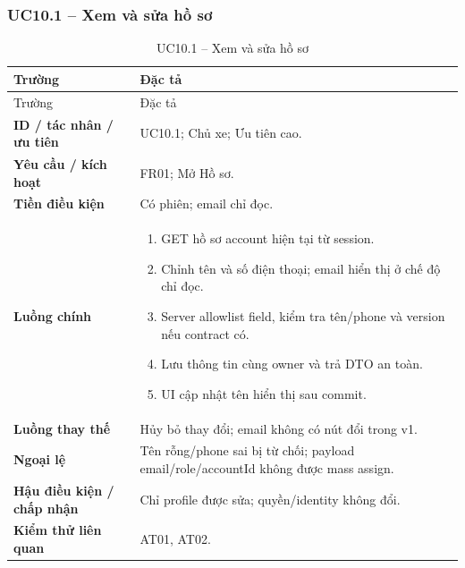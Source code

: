 \subsubsection{UC10.1 -- Xem và sửa hồ sơ}\label{uc:UC10.1}
\begin{smalltable}\begin{longtable}{L{3.2cm}L{11.8cm}}
\caption{UC10.1 -- Xem và sửa hồ sơ}\label{tab:UC10.1}\\
\toprule Trường & Đặc tả\\\midrule\endfirsthead
\toprule Trường & Đặc tả\\\midrule\endhead
\textbf{ID / tác nhân / ưu tiên} & UC10.1; Chủ xe; Ưu tiên cao.\\
\textbf{Yêu cầu / kích hoạt} & FR01; Mở Hồ sơ.\\
\textbf{Tiền điều kiện} & Có phiên; email chỉ đọc.\\
\textbf{Luồng chính} & \begin{enumerate}[leftmargin=*,nosep]
\item GET hồ sơ account hiện tại từ session.
\item Chỉnh tên và số điện thoại; email hiển thị ở chế độ chỉ đọc.
\item Server allowlist field, kiểm tra tên/phone và version nếu contract có.
\item Lưu thông tin cùng owner và trả DTO an toàn.
\item UI cập nhật tên hiển thị sau commit.
\end{enumerate}\\
\textbf{Luồng thay thế} & Hủy bỏ thay đổi; email không có nút đổi trong v1.\\
\textbf{Ngoại lệ} & Tên rỗng/phone sai bị từ chối; payload email/role/accountId không được mass assign.\\
\textbf{Hậu điều kiện / chấp nhận} & Chỉ profile được sửa; quyền/identity không đổi.\\
\textbf{Kiểm thử liên quan} & AT01, AT02.\\
\bottomrule\end{longtable}\end{smalltable}
